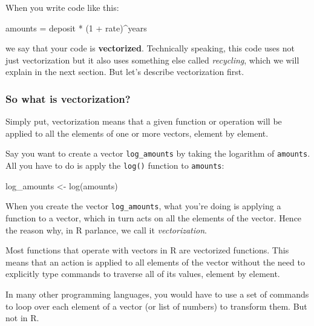 \documentclass[
]{book}
\newenvironment{Shaded}{\begin{snugshade}}{\end{snugshade}}
\newcommand{\DecValTok}[1]{\textcolor[rgb]{0.00,0.00,0.81}{#1}}
\newcommand{\FunctionTok}[1]{\textcolor[rgb]{0.00,0.00,0.00}{#1}}
\newcommand{\NormalTok}[1]{#1}
\newcommand{\OtherTok}[1]{\textcolor[rgb]{0.56,0.35,0.01}{#1}}
\newcommand{\SpecialCharTok}[1]{\textcolor[rgb]{0.00,0.00,0.00}{#1}}
\begin{document}
When you write code like this:

\begin{Shaded}
\begin{Highlighting}[]
\NormalTok{amounts }\OtherTok{=}\NormalTok{ deposit }\SpecialCharTok{*}\NormalTok{ (}\DecValTok{1} \SpecialCharTok{+}\NormalTok{ rate)}\SpecialCharTok{\^{}}\NormalTok{years}
\end{Highlighting}
\end{Shaded}

we say that your code is \textbf{vectorized}. Technically speaking, this code uses
not just vectorization but it also uses something else called \emph{recycling}, which
we will explain in the next section. But let's describe vectorization first.

\hypertarget{so-what-is-vectorization}{%
\subsubsection*{So what is vectorization?}\label{so-what-is-vectorization}}

Simply put, vectorization means that a given function or operation will be
applied to all the elements of one or more vectors, element by element.

Say you want to create a vector \texttt{log\_amounts} by taking the logarithm of
\texttt{amounts}. All you have to do is apply the \texttt{log()} function to \texttt{amounts}:

\begin{Shaded}
\begin{Highlighting}[]
\NormalTok{log\_amounts }\OtherTok{\textless{}{-}} \FunctionTok{log}\NormalTok{(amounts)}
\end{Highlighting}
\end{Shaded}

When you create the vector \texttt{log\_amounts}, what you're doing is applying a
function to a vector, which in turn acts on all the elements of the vector.
Hence the reason why, in R parlance, we call it \emph{vectorization}.

Most functions that operate with vectors in R are vectorized functions. This
means that an action is applied to all elements of the vector without the need
to explicitly type commands to traverse all of its values, element by element.

In many other programming languages, you would have to use a set of commands
to loop over each element of a vector (or list of numbers) to transform them.
But not in R.
\end{document}
